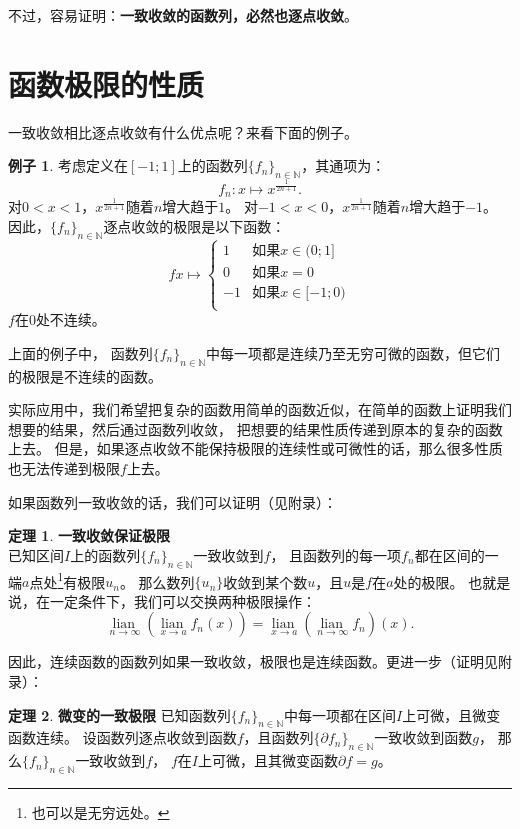 \documentclass[12pt,UTF8]{ctexbook}
\newcommand{\lian}[1]{
    \underset{#1}{\operatorname{lian}\,}
}
\theoremstyle{definition}
\newtheorem{tm}{定理}[section]
\newtheorem{ex}{例子}[section]
\theoremstyle{plain}
\begin{document}
不过，容易证明：\textbf{一致收敛的函数列，必然也逐点收敛}。

\section{函数极限的性质}

一致收敛相比逐点收敛有什么优点呢？来看下面的例子。

\begin{ex}
    考虑定义在$[-1;1]$上的函数列$\{f_n\}_{n\in\mathbb{N}}$，其通项为：
    $$ f_n: x \mapsto x^{\frac{1}{2n+1}}. $$
    对$0<x<1$，$x^{\frac{1}{2n+1}}$随着$n$增大趋于$1$。
    对$-1<x<0$，$x^{\frac{1}{2n+1}}$随着$n$增大趋于$-1$。
    因此，$\{f_n\}_{n\in\mathbb{N}}$逐点收敛的极限是以下函数：
    $$
    f x\mapsto \left\{
        \begin{array}{ll}
            1 & \mbox{如果} x \in (0; 1] \\
            0 & \mbox{如果} x = 0 \\
            -1 & \mbox{如果} x \in [-1; 0) \\
        \end{array}
    \right.
    $$
    $f$在$0$处不连续。
\end{ex}
上面的例子中，
函数列$\{f_n\}_{n\in\mathbb{N}}$中每一项都是连续乃至无穷可微的函数，但它们的极限是不连续的函数。

实际应用中，我们希望把复杂的函数用简单的函数近似，在简单的函数上证明我们想要的结果，然后通过函数列收敛，
把想要的结果性质传递到原本的复杂的函数上去。
但是，如果逐点收敛不能保持极限的连续性或可微性的话，那么很多性质也无法传递到极限$f$上去。

如果函数列一致收敛的话，我们可以证明（见附录）：
\begin{tm}\textbf{一致收敛保证极限}\\
    已知区间$I$上的函数列$\{f_n\}_{n\in\mathbb{N}}$一致收敛到$f$，
    且函数列的每一项$f_n$都在区间的一端$a$点处\footnote{也可以是无穷远处。}有极限$u_n$。
    那么数列$\{u_n\}$收敛到某个数$u$，且$u$是$f$在$a$处的极限。
    也就是说，在一定条件下，我们可以交换两种极限操作：
    $$ \lian{n\to \infty} \left( \lian{x\to a} f_n(x) \right) = \lian{x\to a} \left(\lian{n\to \infty} f_n \right) (x). $$
\end{tm}

因此，连续函数的函数列如果一致收敛，极限也是连续函数。更进一步（证明见附录）：

\begin{tm}{\textbf{微变的一致极限}}
    已知函数列$\{f_n\}_{n\in\mathbb{N}}$中每一项都在区间$I$上可微，且微变函数连续。
    设函数列逐点收敛到函数$f$，且函数列$\{\partial f_n\}_{n\in\mathbb{N}}$一致收敛到函数$g$，
    那么$\{f_n\}_{n\in\mathbb{N}}$一致收敛到$f$，
    $f$在$I$上可微，且其微变函数$\partial f = g$。
\end{tm}
\end{document}
